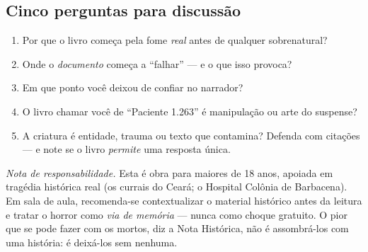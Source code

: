 \subsection*{Cinco perguntas para discussão}
\begin{enumerate}[leftmargin=1.6em]
\item Por que o livro começa pela fome \emph{real} antes de qualquer
sobrenatural?
\item Onde o \emph{documento} começa a ``falhar'' --- e o que isso provoca?
\item Em que ponto você deixou de confiar no narrador?
\item O livro chamar você de ``Paciente 1.263'' é manipulação ou arte do
suspense?
\item A criatura é entidade, trauma ou texto que contamina? Defenda com
citações --- e note se o livro \emph{permite} uma resposta única.
\end{enumerate}

\vspace{0.6em}
\noindent{\small\color{aparatoacc}\rule{\linewidth}{0.6pt}}
\vspace{0.4em}

\noindent\small\textit{Nota de responsabilidade.} Esta é obra para maiores de
18 anos, apoiada em tragédia histórica real (os currais do Ceará; o Hospital
Colônia de Barbacena). Em sala de aula, recomenda-se contextualizar o material
histórico antes da leitura e tratar o horror como \emph{via de memória} ---
nunca como choque gratuito. O pior que se pode fazer com os mortos, diz a Nota
Histórica, não é assombrá-los com uma história: é deixá-los sem nenhuma.

\clearpage
